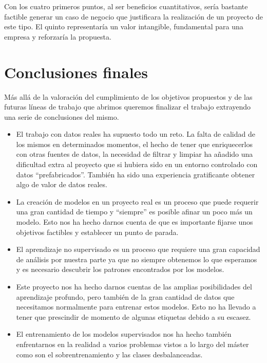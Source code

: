 Con los cuatro primeros puntos, al ser beneficios cuantitativos, sería bastante factible generar un caso de negocio que justificara la realización de un proyecto de este tipo. El quinto representaría un valor intangible, fundamental para una empresa y reforzaría la propuesta.



\section{Conclusiones finales}
\label{section:con:fin}

Más allá de la valoración del cumplimiento de los objetivos propuestos y de las futuras líneas de trabajo que abrimos queremos finalizar el trabajo extrayendo una serie de  conclusiones del mismo. 


\begin{itemize}
\item El trabajo con datos reales ha supuesto todo un reto. La falta de calidad de los mismos en determinados momentos, el hecho de tener que enriquecerlos con otras fuentes de datos, la necesidad de filtrar y limpiar ha añadido una dificultad extra al proyecto que si hubiera sido en un entorno controlado con datos ``prefabricados''. También ha sido una experiencia gratificante obtener algo de valor de datos reales. 

\item La creación de modelos en un proyecto real es un proceso que puede requerir una gran cantidad de tiempo y ``siempre'' es posible afinar un poco más un modelo. Esto nos ha hecho darnos cuenta de que es importante fijarse unos objetivos factibles y establecer un punto de parada.

\item El aprendizaje no supervisado es un proceso que requiere una gran capacidad de análisis por nuestra parte ya que no siempre obtenemos lo que esperamos y es necesario descubrir los patrones encontrados por los modelos.

\item Este proyecto nos ha hecho darnos cuentas de las amplias posibilidades del aprendizaje profundo, pero también de la gran cantidad de datos que necesitamos normalmente para entrenar estos modelos. Esto no ha llevado a tener que prescindir de momento de algunas etiquetas debido a su escasez.  

\item El entrenamiento de los modelos supervisados nos ha hecho también enfrentarnos en la realidad a varios problemas vistos a lo largo del máster como son el sobrentrenamiento y las clases desbalanceadas. 


\end{itemize}
